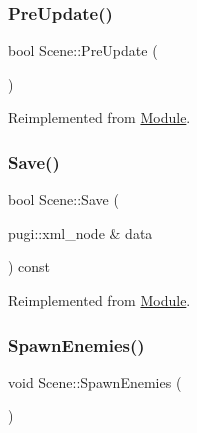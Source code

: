 \mbox{\label{class_scene_aec633b956df0e05760f2274b5816d321}} 
\subsubsection{\texorpdfstring{PreUpdate()}{PreUpdate()}}
{\footnotesize\ttfamily bool Scene\+::\+Pre\+Update (\begin{DoxyParamCaption}{ }\end{DoxyParamCaption})\hspace{0.3cm}{\ttfamily [virtual]}}



Reimplemented from \mbox{\hyperlink{class_module_a2c64af5917825500cf6f0497258bc398}{Module}}.

\mbox{\label{class_scene_a99b7629c7c9affe3fc2bd24a8c45bed4}} 
\subsubsection{\texorpdfstring{Save()}{Save()}}
{\footnotesize\ttfamily bool Scene\+::\+Save (\begin{DoxyParamCaption}\item[{pugi\+::xml\+\_\+node \&}]{data }\end{DoxyParamCaption}) const\hspace{0.3cm}{\ttfamily [virtual]}}



Reimplemented from \mbox{\hyperlink{class_module_aae4bfdba7949d0f94bd8073b3a27dc3d}{Module}}.

\mbox{\label{class_scene_a6b3e2d3a301d43512f14cde45e52650f}} 
\subsubsection{\texorpdfstring{SpawnEnemies()}{SpawnEnemies()}}
{\footnotesize\ttfamily void Scene\+::\+Spawn\+Enemies (\begin{DoxyParamCaption}{ }\end{DoxyParamCaption})}

\mbox{\label{class_scene_a515150d1fcdc233358107bdb5ad23a66}} 
